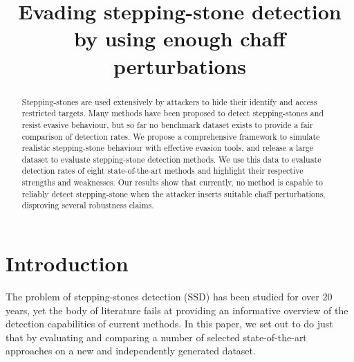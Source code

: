 \documentclass[runningheads,11pt]{llncs}\usepackage[]{graphicx}\usepackage[]{color}
\begin{document}
\title{Evading stepping-stone detection by using enough chaff perturbations}



\maketitle     

\vspace{-0.3cm}
\begin{abstract}

Stepping-stones are used extensively by attackers to hide their identify and access restricted targets. Many methods have been proposed to detect stepping-stones and resist evasive behaviour, but so far no benchmark dataset exists to provide a fair comparison of detection rates. We propose a comprehensive framework to simulate realistic stepping-stone behaviour with effective evasion tools, and release a large dataset to evaluate stepping-stone detection methods. 
We use this data to evaluate detection rates of eight state-of-the-art methods and highlight their respective strengths and weaknesses. Our results show that currently, no method is capable to reliably detect stepping-stone when the attacker inserts suitable chaff perturbations, disproving several robustness claims.

\end{abstract}



\section{Introduction}\label{Sec:Introduction}


The problem of stepping-stones detection (SSD) has been studied for over 20 years, yet the body of literature fails at providing an informative overview of the detection capabilities of current methods. In this paper, we set out to do just that by evaluating and comparing a number of selected state-of-the-art approaches on a new and independently generated dataset.

\end{document}
